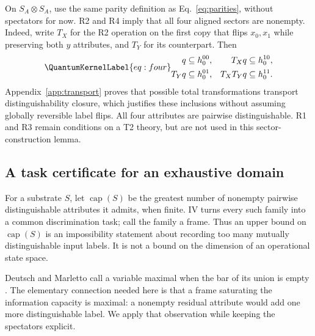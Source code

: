 \documentclass[a4paper,11pt,twocolumn,unpublished]{quantumarticle}
\let\label\QuantumKernelLabel
\DeclareMathOperator{\capn}{cap}
\begin{document}
On $S_A\otimes S_A$, use the same parity definition as Eq.~\eqref{eq:parities}, without spectators for now. R2 and R4 imply that all four aligned sectors are nonempty. Indeed, write $T_X$ for the R2 operation on the first copy that flips $x_0,x_1$ while preserving both $y$ attributes, and $T_Y$ for its counterpart. Then
\begin{equation}\label{eq:four}
\begin{aligned}
 q&\subseteq h^{00}_0,& T_Xq&\subseteq h^{10}_0,\\
 T_Yq&\subseteq h^{01}_0,& T_XT_Yq&\subseteq h^{11}_0.
\end{aligned}
\end{equation}
Appendix~\ref{app:transport} proves that possible total transformations transport distinguishability closure, which justifies these inclusions without assuming globally reversible label flips. All four attributes are pairwise distinguishable. R1 and R3 remain conditions on a T2 theory, but are not used in this sector-construction lemma.

\subsection{A task certificate for an exhaustive domain}
For a substrate $S$, let $\capn(S)$ be the greatest number of nonempty pairwise distinguishable attributes it admits, when finite. IV turns every such family into a common discrimination task; call the family a frame. Thus an upper bound on $\capn(S)$ is an impossibility statement about recording too many mutually distinguishable input labels. It is not a bound on the dimension of an operational state space.

Deutsch and Marletto call a variable maximal when the bar of its union is empty \cite[Sec.~6, p.~14]{cti}. The elementary connection needed here is that a frame saturating the information capacity is maximal: a nonempty residual attribute would add one more distinguishable label. We apply that observation while keeping the spectators explicit.
\end{document}
